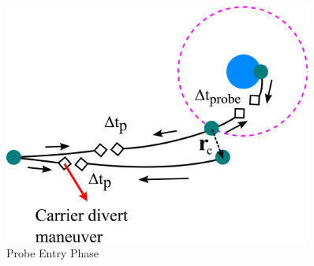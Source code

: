 \begin{figure}[H]
    \centering
    \includegraphics[width=0.9\textwidth]{../../shared_latex_inputs/images/ProbeEntryPhase_zoom.png}
    \caption{Probe Entry Phase}
\end{figure}



